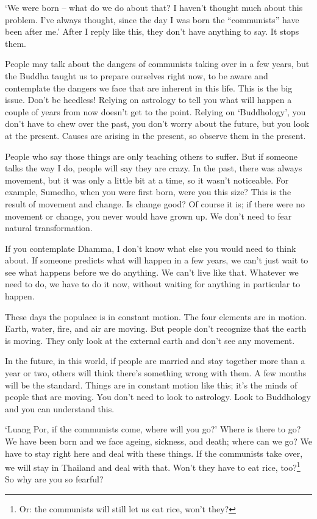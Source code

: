 `We were born -- what do we do about that? I haven't thought much about this problem. I've always thought, since the day I was born the ``communists'' have been after me.' After I reply like this, they don't have anything to say. It stops them.

People may talk about the dangers of communists taking over in a few years, but the Buddha taught us to prepare ourselves right now, to be aware and contemplate the dangers we face that are inherent in this life. This is the big issue. Don't be heedless! Relying on astrology to tell you what will happen a couple of years from now doesn't get to the point. Relying on `Buddhology', you don't have to chew over the past, you don't worry about the future, but you look at the present. Causes are arising in the present, so observe them in the present.

People who say those things are only teaching others to suffer. But if someone talks the way I do, people will say they are crazy. In the past, there was always movement, but it was only a little bit at a time, so it wasn't noticeable. For example, Sumedho, when you were first born, were you this size? This is the result of movement and change. Is change good? Of course it is; if there were no movement or change, you never would have grown up. We don't need to fear natural transformation.

If you contemplate Dhamma, I don't know what else you would need to think about. If someone predicts what will happen in a few years, we can't just wait to see what happens before we do anything. We can't live like that. Whatever we need to do, we have to do it now, without waiting for anything in particular to happen.

These days the populace is in constant motion. The four elements are in motion. Earth, water, fire, and air are moving. But people don't recognize that the earth is moving. They only look at the external earth and don't see any movement.

In the future, in this world, if people are married and stay together more than a year or two, others will think there's something wrong with them. A few months will be the standard. Things are in constant motion like this; it's the minds of people that are moving. You don't need to look to astrology. Look to Buddhology and you can understand this.

`Luang Por, if the communists come, where will you go?' Where is there to go? We have been born and we face ageing, sickness, and death; where can we go? We have to stay right here and deal with these things. If the communists take over, we will stay in Thailand and deal with that. Won't they have to eat rice, too?\footnote{Or: the communists will still let us eat rice, won't they?} So why are you so fearful?

